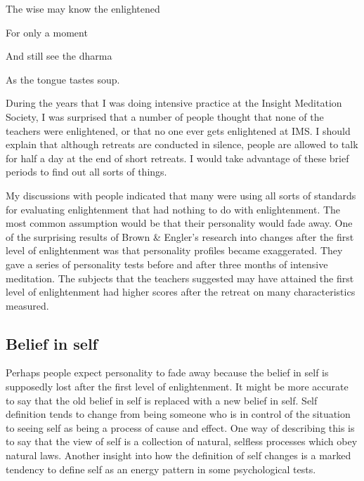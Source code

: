 \documentclass[a5paper,10pt,english]{book}
\begin{document}
\begin{DUlineblock}{0em}
\item[] 
\item[] The wise may know the enlightened
\item[] For only a moment
\item[] And still see the dharma
\item[] As the tongue tastes soup.
\end{DUlineblock}

\sphinxAtStartPar
During the years that I was doing intensive practice at the Insight
Meditation Society, I was surprised that a number of people thought that
none of the teachers were enlightened, or that no one ever gets
enlightened at IMS. I should explain that although retreats are
conducted in silence, people are allowed to talk for half a day at the
end of short retreats. I would take advantage of these brief periods to
find out all sorts of things.

\sphinxAtStartPar
My discussions with people indicated that many were using all sorts of
standards for evaluating enlightenment that had nothing to do with
enlightenment. The most common assumption would be that their
personality would fade away. One of the surprising results of Brown \&
Engler’s research into changes after the first level of enlightenment
was that personality profiles became exaggerated. They gave a series of
personality tests before and after three months of intensive meditation.
The subjects that the teachers suggested may have attained the first
level of enlightenment had higher scores after the retreat on many
characteristics measured.


\subsection{Belief in self}
\label{\detokenize{saints:id2}}
\sphinxAtStartPar
Perhaps people expect personality to fade away because the belief
in self is supposedly lost after the first level of enlightenment. It
might be more accurate to say that the old belief in self is replaced
with a new belief in self. Self definition tends to change from being
someone who is in control of the situation to seeing self as being a
process of cause and effect. One way of describing this is to say that
the view of self is a collection of natural, selfless processes which
obey natural laws. Another insight into how the definition of self
changes is a marked tendency to define self as an energy pattern in some
psychological tests.
\end{document}
